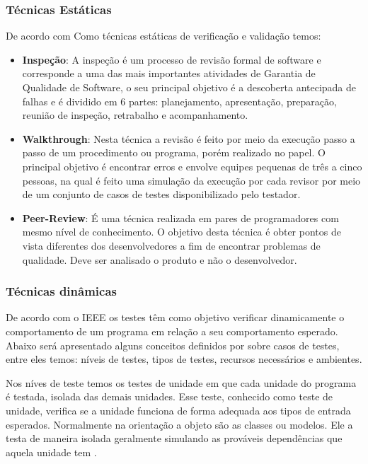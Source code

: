 \subsubsection{Técnicas Estáticas}

De acordo com \cite{myers} Como técnicas estáticas de verificação e validação temos:

\begin{itemize}
  \item \textbf{Inspeção}: A inspeção é um processo de revisão formal de software e corresponde a uma das mais
    importantes atividades de Garantia de Qualidade de Software, o seu principal objetivo é a descoberta antecipada
    de falhas e é dividido em 6 partes: planejamento, apresentação, preparação, reunião de inspeção, retrabalho e
    acompanhamento.
  \item \textbf{Walkthrough}: Nesta técnica a revisão é feito por meio da execução passo a passo de um procedimento ou
    programa, porém realizado no papel. O principal objetivo é encontrar erros e envolve equipes pequenas de três a
    cinco pessoas, na qual é feito uma simulação da execução por cada revisor por meio de um conjunto de casos de testes
    disponibilizado pelo testador.
  \item \textbf{Peer-Review}: É uma técnica realizada em pares de programadores com mesmo nível de conhecimento. O
    objetivo desta técnica é obter pontos de vista diferentes dos desenvolvedores a fim de encontrar problemas de
    qualidade. Deve ser analisado o produto e não o desenvolvedor.
\end{itemize}

\subsubsection{Técnicas dinâmicas}

De acordo com o IEEE os testes têm como objetivo verificar dinamicamente o comportamento de um programa em relação
a seu comportamento esperado. Abaixo será apresentado alguns conceitos definidos por \cite{myers} sobre casos de testes,
entre eles temos: níveis de testes, tipos de testes, recursos necessários e ambientes.

Nos níves de teste temos os testes de unidade em que cada unidade do programa é testada, isolada das demais unidades.
Esse teste, conhecido como teste de unidade, verifica se a unidade funciona de forma adequada aos tipos de entrada
esperados. Normalmente na orientação a objeto são as classes ou modelos. Ele a testa de maneira isolada geralmente
simulando as prováveis dependências que aquela unidade tem \cite{myers}.

